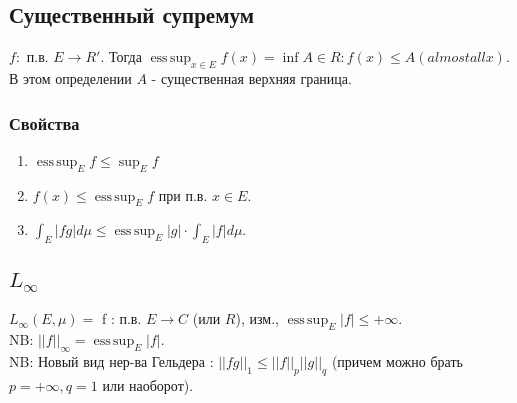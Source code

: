 \documentclass[paper=a4, fontsize=15pt]{article}
\DeclareMathOperator*{\esssup}{ess\, sup}
\begin{document}
\subsection{Существенный супремум}
$f : $ п.в. $E \rightarrow R'$. Тогда $\esssup_{x \in E} f(x) = \inf {A \in R : f(x) \leq A (almost all x)}$. В этом определении $A$ - существенная верхняя граница. 
\subsubsection{Свойства}
\begin{enumerate}
	\item
	$\esssup_E f \leq \sup_E f$
	\item
	$f(x) \leq \esssup_E f$ при п.в. $x \in E$.
	\item
	$\int_E |fg|d\mu \leq \esssup_E |g| \cdot \int_E |f|d\mu$.
\end{enumerate}
\subsection{$L_\infty$}
$L_\infty(E, \mu) =$ {f : п.в. $E \rightarrow C$ (или $R$), изм., $\esssup_E |f| \leq +\infty$}.\\
NB: $||f||_\infty = \esssup_E |f|$.\\
NB: Новый вид нер-ва Гельдера : $||fg||_1 \leq ||f||_p ||g||_q$ (причем можно брать $p = +\infty, q = 1$ или наоборот).
\end{document}

